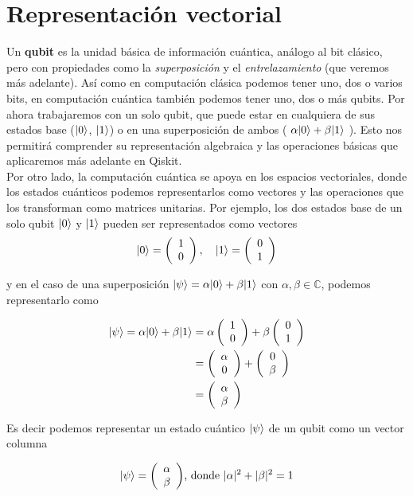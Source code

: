 \section{Representación vectorial}

Un \textbf{qubit} es la unidad básica de información cuántica, análogo al bit clásico, pero con propiedades como la \textit{superposición} y el \textit{entrelazamiento} (que veremos más adelante).
Así como en computación clásica podemos tener uno, dos o varios bits, en computación cuántica también podemos tener uno, dos o más qubits. Por ahora trabajaremos con un solo qubit, que puede estar en cualquiera de sus estados base ($\ket{0}$, $\ket{1}$) o en una superposición de ambos ( $\alpha\ket{0} + \beta\ket{1}$ ). Esto nos permitirá comprender su representación algebraica y las operaciones básicas que aplicaremos más adelante en Qiskit. \\

Por otro lado, la computación cuántica se apoya en los espacios vectoriales, donde los estados cuánticos podemos representarlos como vectores y las operaciones que los transforman como matrices unitarias. Por ejemplo, los dos estados base de un solo qubit $\ket{0}$ y $\ket{1}$ pueden ser representados como vectores
\begin{align*}
	\ket{0} = \vzero, \quad \ket{1} = \vone \\
\end{align*}

y en el caso de una superposición $\ket{\psi} = \alpha\ket{0} + \beta\ket{1}$ con $\alpha, \beta \in \mathbb{C}$, podemos representarlo como

\begin{align*}
	\ket{\psi} = \alpha\ket{0} + \beta\ket{1}   &= \alpha\vzero + \beta\vone \\
	&= \mymatrix{c}{\alpha \\ 0}+\mymatrix{c}{0 \\ \beta} \\
	&= \mymatrix{c}{\alpha \\ \beta} \\
\end{align*}

\noindent Es decir podemos representar un estado cuántico $\ket{\psi}$ de un qubit como un vector columna

\begin{align*}
	\ket{\psi} = \mymatrix{c}{\alpha \\ \beta} &\mbox{, donde } |\alpha|^2 + |\beta|^2 = 1 \\
\end{align*}

